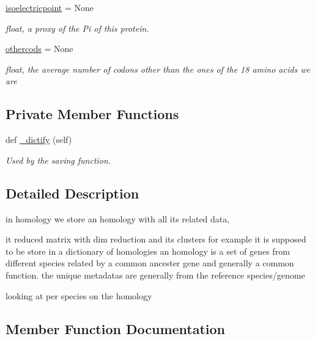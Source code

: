 \begin{DoxyCompactItemize}
\mbox{\hyperlink{class_py_c_u_b_1_1homology_1_1homology_ab3cc7d820ffac1600aea6dbc58995364}{isoelectricpoint}} = None
\begin{DoxyCompactList}\small\item\em float, a proxy of the Pi of this protein. \end{DoxyCompactList}\item 
\mbox{\label{class_py_c_u_b_1_1homology_1_1homology_a0fee75b305ed6adb93ed111cce23218a}} 
\mbox{\hyperlink{class_py_c_u_b_1_1homology_1_1homology_a0fee75b305ed6adb93ed111cce23218a}{othercods}} = None
\begin{DoxyCompactList}\small\item\em float, the average number of codons other than the ones of the 18 amino acids we are \end{DoxyCompactList}\end{DoxyCompactItemize}
\subsection*{Private Member Functions}
\begin{DoxyCompactItemize}
\item 
def \mbox{\hyperlink{class_py_c_u_b_1_1homology_1_1homology_af7f186d30cb3469d73782da85f9d06bc}{\+\_\+dictify}} (self)
\begin{DoxyCompactList}\small\item\em Used by the saving function. \end{DoxyCompactList}\end{DoxyCompactItemize}


\subsection{Detailed Description}
in homology we store an homology with all its related data, 

it reduced matrix with dim reduction and its clusters for example it is supposed to be store in a dictionary of homologies an homology is a set of genes from different species related by a common ancester gene and generally a common function. the unique metadatas are generally from the reference species/genome

\begin{DoxyVerb}        looking at per species on the homology\end{DoxyVerb}
 

\subsection{Member Function Documentation}
\mbox{\label{class_py_c_u_b_1_1homology_1_1homology_af7f186d30cb3469d73782da85f9d06bc}} 
